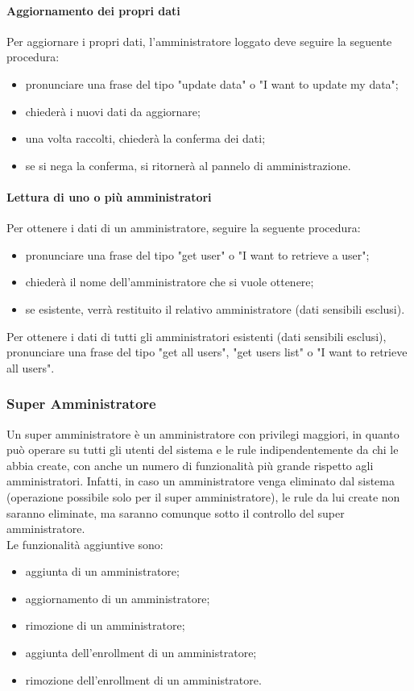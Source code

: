\paragraph{Aggiornamento dei propri dati}

Per aggiornare i propri dati, l'amministratore loggato deve seguire la seguente procedura:
\begin{itemize}
	\item pronunciare una frase del tipo "update data" o "I want to update my data";
	\item \PROGETTO{} chiederà i nuovi dati da aggiornare;
	\item una volta raccolti, \PROGETTO{} chiederà la conferma dei dati;
	\item se si nega la conferma, si ritornerà al pannelo di amministrazione.
\end{itemize}

\paragraph{Lettura di uno o più amministratori}
Per ottenere i dati di un amministratore, seguire la seguente procedura:
\begin{itemize}
	\item pronunciare una frase del tipo "get user" o "I want to retrieve a user";
	\item \PROGETTO{} chiederà il nome dell'amministratore che si vuole ottenere;
	\item se esistente, verrà restituito il relativo amministratore (dati sensibili esclusi).
\end{itemize}

Per ottenere i dati di tutti gli amministratori esistenti (dati sensibili esclusi), pronunciare una frase del tipo "get all users", "get users list" o "I want to retrieve all users".

\subsubsection{Super Amministratore}\label{superAdmin}
Un super amministratore è un amministratore con privilegi maggiori, in quanto può operare su tutti gli utenti del sistema e le rule indipendentemente da chi le abbia create, con anche un numero di funzionalità più grande rispetto agli amministratori.
Infatti, in caso un amministratore venga eliminato dal sistema (operazione possibile solo per il super amministratore), le rule da lui create non saranno eliminate, ma saranno comunque sotto il controllo del super amministratore. \\
Le funzionalità aggiuntive sono:
\begin{itemize}
	\item aggiunta di un amministratore;
	\item aggiornamento di un amministratore;
	\item rimozione di un amministratore;
	\item aggiunta dell'enrollment di un amministratore;
	\item rimozione dell'enrollment di un amministratore.
\end{itemize}
